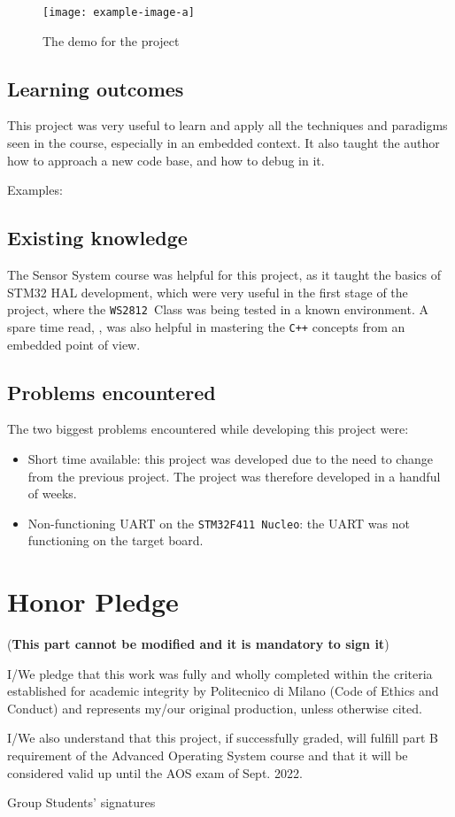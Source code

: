 \documentclass[10pt,a4]{article}
\newcommand{\stm}{\texttt{STM32F411 }}
\newcommand{\ws}{\texttt{WS2812 }}
\begin{document}
\begin{figure}
\texttt{[image: example-image-a]}
\caption{\label{fig:encoding}The demo for the project}
\end{figure}
\subsection{Learning outcomes}

This project was very useful to learn and apply all the  techniques and paradigms seen in the course, especially in an embedded context. It also taught the author how to approach a new code base, and how to debug in it.

Examples:


\subsection{Existing knowledge}
The Sensor System course was helpful for this project, as it taught the basics of STM32 HAL development, which were very useful in the first stage of the project, where the \ws Class was being tested in a known environment. A spare time read, \cite{kormanyos2021real}, was also helpful in mastering the \texttt{C++} concepts from an embedded point of view.


\subsection{Problems encountered}
The two biggest problems encountered while developing this project were:
\begin{itemize}
\item Short time available: this project was developed due to the need to change from the previous project. The project was therefore developed in a handful of weeks.
\item Non-functioning UART on the \stm \texttt{Nucleo}: the UART was not functioning on the target board. 
\end{itemize}

\section{Honor Pledge}
(\textbf{This part cannot be modified and it is mandatory to sign it})

I/We pledge that this work was fully and wholly completed within the criteria
established for academic integrity by Politecnico di Milano (Code of Ethics and
Conduct) and represents my/our original production, unless otherwise cited.

I/We also understand that this project, if successfully graded,  will fulfill part B requirement of the
Advanced Operating System course and that it will be considered valid up until
the AOS exam of Sept. 2022. 

\begin{flushright}
Group Students' signatures
\end{flushright}



\end{document}
